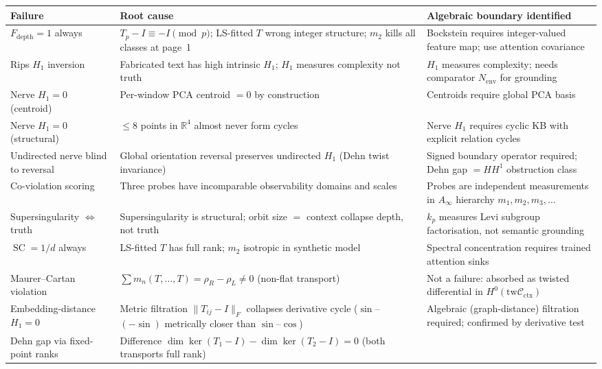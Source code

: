 \documentclass[11pt]{amsart}
\theoremstyle{definition}
\newcommand{\Cctx}{\mathcal{C}_{\!\mathrm{ctx}}}
\newcommand{\Nenv}{N_{\mathrm{env}}}
\newcommand{\rhoR}{\rho_R}
\newcommand{\rhoL}{\rho_L}
\DeclareMathOperator{\SC}{SC}
\newcommand{\twCtx}{\mathrm{tw}\Cctx}
\begin{document}
\begin{center}
\renewcommand{\arraystretch}{1.3}
\begin{tabularx}{\textwidth}{@{}p{3.1cm}Xp{3.2cm}@{}}
\toprule
Failure & Root cause & Algebraic boundary identified \\
\midrule
$F_\mathrm{depth} = 1$ always
  & $T_p - I \equiv -I \pmod{p}$; LS-fitted $T$ wrong integer structure;
    $m_2$ kills all classes at page~1
  & Bockstein requires integer-valued feature map; use attention covariance \\
Rips $H_1$ inversion
  & Fabricated text has high intrinsic $H_1$; $H_1$ measures complexity not truth
  & $H_1$ measures complexity; needs comparator $\Nenv$ for grounding \\
Nerve $H_1 = 0$ (centroid)
  & Per-window PCA centroid $= 0$ by construction
  & Centroids require global PCA basis \\
Nerve $H_1 = 0$ (structural)
  & $\leq 8$ points in $\mathbb{R}^4$ almost never form cycles
  & Nerve $H_1$ requires cyclic KB with explicit relation cycles \\
Undirected nerve blind to reversal
  & Global orientation reversal preserves undirected $H_1$ (Dehn twist invariance)
  & Signed boundary operator required; Dehn gap $= HH^1$ obstruction class \\
Co-violation scoring
  & Three probes have incomparable observability domains and scales
  & Probes are independent measurements in $A_\infty$ hierarchy $m_1,m_2,m_3,\ldots$ \\
Supersingularity $\Leftrightarrow$ truth
  & Supersingularity is structural; orbit size $=$ context collapse depth, not truth
  & $k_p$ measures Levi subgroup factorisation, not semantic grounding \\
$\SC = 1/d$ always
  & LS-fitted $T$ has full rank; $m_2$ isotropic in synthetic model
  & Spectral concentration requires trained attention sinks \\
Maurer--Cartan violation
  & $\sum m_n(T,\ldots,T) = \rhoR - \rhoL \neq 0$ (non-flat transport)
  & Not a failure: absorbed as twisted differential in $H^0(\twCtx)$ \\
Embedding-distance $H_1=0$
  & Metric filtration $\|T_{ij}-I\|_F$ collapses derivative cycle ($\sin$--$(-\sin)$
    metrically closer than $\sin$--$\cos$)
  & Algebraic (graph-distance) filtration required; confirmed by derivative test \\
Dehn gap via fixed-point ranks
  & Difference $\dim\ker(T_1-I) - \dim\ker(T_2-I) = 0$ (both transports full rank)

\end{tabularx}
\end{center}
\end{document}
